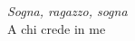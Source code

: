 \thispagestyle{empty}
\vspace*{6cm}
\begin{flushright}
  \textit{
    Sogna, ragazzo, sogna\\
  }
  \vspace{1cm}
  A chi crede in me\\
\end{flushright}